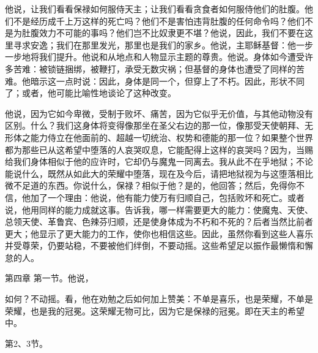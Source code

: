 他说，让我们看看保禄如何服侍天主；让我们看看贪食者如何服侍他们的肚腹。他们不是经历成千上万这样的死亡吗？他们不是害怕违背肚腹的任何命令吗？他们不是为肚腹效力不可能的事吗？他们岂不比奴隶更不堪？他说，因此，我们不要在这里寻求安逸；我们在那里发光，那里也是我们的家乡。他说，主耶稣基督：他一步一步地将我们提升。他说和从地点和人物显示主题的尊贵。他说。身体如今遭受许多苦难：被锁链捆绑，被鞭打，承受无数灾祸；但基督的身体也遭受了同样的苦难。他暗示这一点时说：因此，身体是同一个，但穿上了不朽。因此，形状不同了；或者，他可能比喻性地谈论了这种改变。\par

他说，因为它如今卑微，受制于败坏、痛苦，因为它似乎无价值，与其他动物没有区别。什么？我们这身体将变得像那坐在圣父右边的那一位，像那受天使朝拜、无形体之能力侍立在他面前的、超越一切统治、权势和德能的那一位？如果整个世界都为那些已从这希望中堕落的人哀哭叹息，它能配得上这样的哀哭吗？因为，当赐给我们身体相似于他的应许时，它却仍与魔鬼一同离去。我从此不在乎地狱；不论能说什么，既然从如此大的荣耀中堕落，现在及今后，请把地狱视为与这堕落相比微不足道的东西。你说什么，保禄？相似于他？是的，他回答；然后，免得你不信，他加了一个理由：他说，他有能力使万有归顺自己，包括败坏和死亡。或者说，他用同样的能力成就这事。告诉我，哪一样需要更大的能力：使魔鬼、天使、总领天使、革鲁宾、色辣芬归顺，还是使身体成为不朽和不死的？后者当然比前者更大；他显示了更大能力的工作，使你也相信这些。因此，虽然你看到这些人喜乐并受尊荣，仍要站稳，不要被他们绊倒，不要动摇。这些希望足以振作最懒惰和懈怠的人。\par

第四章 第一节。他说，\par

如何？不动摇。看，他在劝勉之后如何加上赞美：不单是喜乐，也是荣耀，不单是荣耀，也是我的冠冕。这荣耀无物可比，因为它是保禄的冠冕。即在天主的希望中。\par

第2、3节。\par

